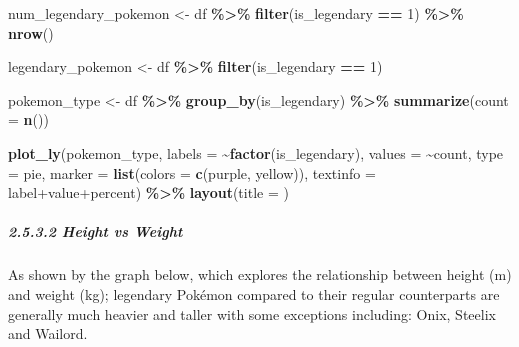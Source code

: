 \documentclass[
]{article}
\newenvironment{Shaded}{\begin{snugshade}}{\end{snugshade}}
\newcommand{\AttributeTok}[1]{\textcolor[rgb]{0.13,0.29,0.53}{#1}}
\newcommand{\DecValTok}[1]{\textcolor[rgb]{0.00,0.00,0.81}{#1}}
\newcommand{\FunctionTok}[1]{\textcolor[rgb]{0.13,0.29,0.53}{\textbf{#1}}}
\newcommand{\NormalTok}[1]{#1}
\newcommand{\OtherTok}[1]{\textcolor[rgb]{0.56,0.35,0.01}{#1}}
\newcommand{\SpecialCharTok}[1]{\textcolor[rgb]{0.81,0.36,0.00}{\textbf{#1}}}
\newcommand{\StringTok}[1]{\textcolor[rgb]{0.31,0.60,0.02}{#1}}
\begin{document}
\begin{Shaded}
\begin{Highlighting}[]
\NormalTok{num\_legendary\_pokemon }\OtherTok{\textless{}{-}}\NormalTok{ df }\SpecialCharTok{\%\textgreater{}\%}
  \FunctionTok{filter}\NormalTok{(is\_legendary }\SpecialCharTok{==} \DecValTok{1}\NormalTok{) }\SpecialCharTok{\%\textgreater{}\%}
  \FunctionTok{nrow}\NormalTok{()}

\NormalTok{legendary\_pokemon }\OtherTok{\textless{}{-}}\NormalTok{ df }\SpecialCharTok{\%\textgreater{}\%}
  \FunctionTok{filter}\NormalTok{(is\_legendary }\SpecialCharTok{==} \DecValTok{1}\NormalTok{)}

\NormalTok{pokemon\_type }\OtherTok{\textless{}{-}}\NormalTok{ df }\SpecialCharTok{\%\textgreater{}\%}
  \FunctionTok{group\_by}\NormalTok{(is\_legendary) }\SpecialCharTok{\%\textgreater{}\%}
  \FunctionTok{summarize}\NormalTok{(}\AttributeTok{count =} \FunctionTok{n}\NormalTok{())}

\FunctionTok{plot\_ly}\NormalTok{(pokemon\_type, }\AttributeTok{labels =} \SpecialCharTok{\textasciitilde{}}\FunctionTok{factor}\NormalTok{(is\_legendary), }\AttributeTok{values =} \SpecialCharTok{\textasciitilde{}}\NormalTok{count, }\AttributeTok{type =} \StringTok{\textquotesingle{}pie\textquotesingle{}}\NormalTok{,}
        \AttributeTok{marker =} \FunctionTok{list}\NormalTok{(}\AttributeTok{colors =} \FunctionTok{c}\NormalTok{(}\StringTok{\textquotesingle{}purple\textquotesingle{}}\NormalTok{, }\StringTok{\textquotesingle{}yellow\textquotesingle{}}\NormalTok{)),}
        \AttributeTok{textinfo =} \StringTok{\textquotesingle{}label+value+percent\textquotesingle{}}\NormalTok{) }\SpecialCharTok{\%\textgreater{}\%}
        \FunctionTok{layout}\NormalTok{(}\AttributeTok{title =} \StringTok{\textquotesingle{}\textquotesingle{}}\NormalTok{)}
\end{Highlighting}
\end{Shaded}

\subparagraph{2.5.3.2 Height vs Weight}\label{height-vs-weight}

As shown by the graph below, which explores the relationship between
height (m) and weight (kg); legendary Pokémon compared to their regular
counterparts are generally much heavier and taller with some exceptions
including: Onix, Steelix and Wailord.
\end{document}
